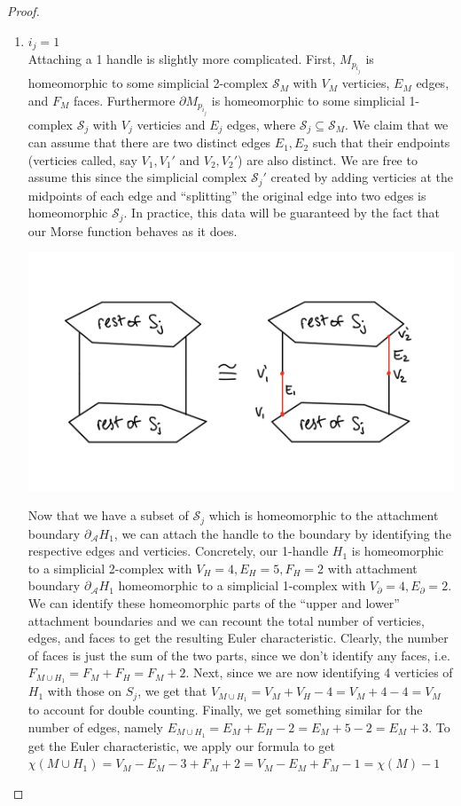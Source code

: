\documentclass[12pt]{article}
\newcommand{\cA}{{\mathcal A}}
\newcommand{\cS}{{\mathcal S}}
\theoremstyle{definition}
\begin{document}
\begin{proof}
\begin{enumerate}
            \item $i_j = 1$\\
            Attaching a 1 handle is slightly more complicated. First, $M_{p_{i_j}}$ is homeomorphic to some simplicial 2-complex $\cS_M$ with $V_M$ verticies, $E_M$ edges, and $F_M$ faces. Furthermore $\partial M_{p_{i_j}}$ is homeomorphic to some simplicial 1-complex $\cS_j$ with $V_j$ verticies and $E_j$ edges, where $\cS_j \subseteq \cS_M$. We claim that we can assume that there are two distinct edges $E_1, E_2$ such that their endpoints (verticies called, say $V_1, V_1'$ and $V_2,V_2'$) are also distinct. We are free to assume this since the simplicial complex $\cS_j'$ created by adding verticies at the midpoints of each edge and ``splitting'' the original edge into two edges is homeomorphic $\cS_j$. In practice, this data will be guaranteed by the fact that our Morse function behaves as it does. 
            \begin{center}
                  \includegraphics[scale = 0.3]{sim.png}
            \end{center}
            Now that we have a subset of $\cS_j$ which is homeomorphic to the attachment boundary $\partial_\cA H_1$, we can attach the handle to the boundary by identifying the respective edges and verticies. Concretely, our 1-handle $H_1$ is homeomorphic to a simplicial 2-complex with $V_H = 4, E_H = 5, F_H = 2$ with attachment boundary $\partial_\cA H_1$ homeomorphic to a simplicial 1-complex with $V_\partial = 4, E_\partial = 2$. We can identify these homeomorphic parts of the ``upper and lower'' attachment boundaries and we can recount the total number of verticies, edges, and faces to get the resulting Euler characteristic. Clearly, the number of faces is just the sum of the two parts, since we don't identify any faces, i.e. $F_{M\cup H_1} = F_M + F_H = F_M + 2$. Next, since we are now identifying 4 verticies of $H_1$ with those on $S_j$, we get that $V_{M\cup H_1} = V_M + V_H - 4 = V_M + 4 - 4 = V_M$ to account for double counting. Finally, we get something similar for the number of edges, namely $E_{M\cup H_1} = E_M + E_H - 2 = E_M + 5 - 2 = E_M + 3$. To get the Euler characteristic, we apply our formula to get $\chi(M \cup H_1) = V_M - E_M - 3 + F_M + 2 = V_M - E_M+ F_M -1 = \chi(M)-1$
            


\end{enumerate}
\end{proof}
\end{document}
